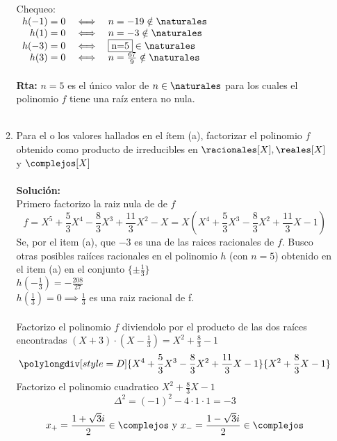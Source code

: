 \begin{enumerate}[label=\alph*)]
\begin{enumerate}[label=\alph*)]
Chequeo:\\
$
\begin{array}{rcl}
h(-1)=0 & \iff & n=-19 \notin \naturales \\
h(1)=0  & \iff & n=-3 \notin \naturales \\
h(-3)=0 & \iff & \fbox{n=5} \in \naturales \\
h(3)=0  & \iff & n=\frac{67}{9} \notin \naturales \\
\end{array}
$ \\
\\
\textbf{Rta:} $n=5$ es el único valor de $n\in\naturales$ para los cuales el polinomio $f$ tiene una raíz entera no nula.\\
\\
\item 
Para el o los valores hallados en el ítem (a), factorizar el polinomio $f$ obtenido como producto de irreducibles en $\racionales[X],\reales[X]$ y $\complejos[X]$ \\
\\
\textbf{Solución:}\\
Primero factorizo la raiz nula de de $f$ \\
$$
f=X^5 + \frac{5}{3}X^4 - \frac{8}{3}X^3 + \frac{11}{3}X^2 - X = 
X(X^4 + \frac{5}{3}X^3 - \frac{8}{3}X^2 + \frac{11}{3}X - 1)
$$
Se, por el item (a), que $-3$ es una de las raices racionales de $f$. Busco otras posibles raiíces racionales en el polinomio $h$ (con $n=5$) obtenido en el item (a) en el conjunto $\{ \pm\frac{1}{3} \}$ \\
$h(-\frac{1}{3})=-\frac{208}{27}$ \\
$h(\frac{1}{3})=0 \implies \frac{1}{3}$ es una raiz racional de f. \\
\\
Factorizo el polinomio $f$ diviendolo por el producto de las dos raíces encontradas $(X+3)\cdot(X-\frac{1}{3}) = X^2 + \frac{8}{3} - 1$
$$
\polylongdiv[style=D]{X^4 + \frac{5}{3}X^3 - \frac{8}{3}X^2 + \frac{11}{3}X - 1}{X^2 + \frac{8}{3}X - 1}
$$
Factorizo el polinomio cuadratico $X^2 + \frac{8}{3}X - 1$
$$ \Delta^2 = (-1)^2 - 4 \cdot 1 \cdot 1=-3 $$
$$ x_+ = \frac{1 + \sqrt 3 i}{2} \in\complejos \text{ y } x_- = \frac{1 - \sqrt 3 i}{2} \in\complejos $$


\end{enumerate}
\end{enumerate}
